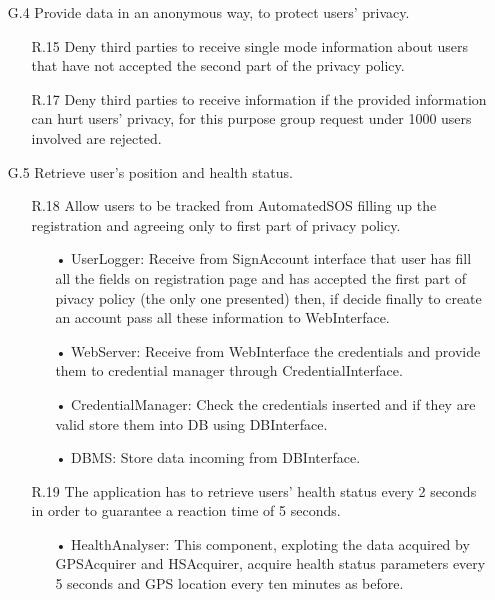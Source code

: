 \begin{enumerate}
\item [G.4] Provide data in an anonymous way, to protect users' privacy.
	\begin{enumerate}
    \item [R.15] Deny third parties to receive single mode information about users that have not accepted the second part of the privacy policy.
    \item [R.17] Deny third parties to receive information if the provided information can hurt users' privacy, for this purpose group request under 1000 users involved are rejected.
    \end{enumerate}	


\item [G.5] Retrieve user's position and health status.
	\begin{enumerate}
	\item [R.18] Allow users to be tracked from AutomatedSOS filling up the registration and agreeing only to first part of privacy policy.
		\begin{enumerate}
		\item[•] UserLogger: Receive from SignAccount interface that user has fill all the fields on registration page and has accepted the first part of pivacy policy (the only one presented) then, if decide finally to create an account pass all these information to WebInterface.
		\item[•] WebServer: Receive from WebInterface the credentials and provide them to credential manager through CredentialInterface.
		\item[•] CredentialManager: Check the credentials inserted and if they are valid store them into DB using DBInterface.
		\item[•] DBMS: Store data incoming from DBInterface.
		\end{enumerate}
		
	\item [R.19] The application has to retrieve users' health status every 2 seconds in order to guarantee a reaction time of 5 seconds.
		\begin{enumerate}
		\item[•] HealthAnalyser: This component, exploting the data acquired by GPSAcquirer and HSAcquirer, acquire health status parameters every 5 seconds and GPS location every ten minutes as before.
		\end{enumerate}	
	\end{enumerate}	
	

\end{enumerate}
